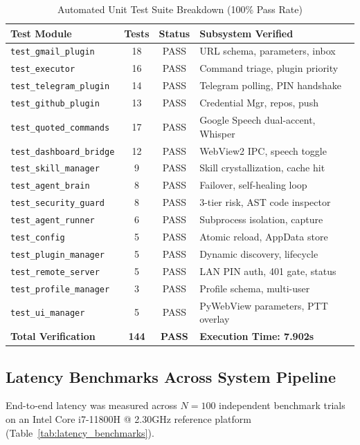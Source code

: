 \documentclass[conference]{IEEEtran}
\begin{document}
\begin{table}[htbp]
\centering
\caption{Automated Unit Test Suite Breakdown (100\% Pass Rate)}
\label{tab:test_suite}
\small
\begin{tabularx}{\columnwidth}{|l|c|c|X|}
\hline
\textbf{Test Module} & \textbf{Tests} & \textbf{Status} & \textbf{Subsystem Verified} \\ \hline
\texttt{test\_gmail\_plugin} & 18 & PASS & URL schema, parameters, inbox \\ \hline
\texttt{test\_executor} & 16 & PASS & Command triage, plugin priority \\ \hline
\texttt{test\_telegram\_plugin} & 14 & PASS & Telegram polling, PIN handshake \\ \hline
\texttt{test\_github\_plugin} & 13 & PASS & Credential Mgr, repos, push \\ \hline
\texttt{test\_quoted\_commands}& 17 & PASS & Google Speech dual-accent, Whisper \\ \hline
\texttt{test\_dashboard\_bridge}& 12 & PASS & WebView2 IPC, speech toggle \\ \hline
\texttt{test\_skill\_manager} & 9 & PASS & Skill crystallization, cache hit \\ \hline
\texttt{test\_agent\_brain} & 8 & PASS & Failover, self-healing loop \\ \hline
\texttt{test\_security\_guard} & 8 & PASS & 3-tier risk, AST code inspector \\ \hline
\texttt{test\_agent\_runner} & 6 & PASS & Subprocess isolation, capture \\ \hline
\texttt{test\_config} & 5 & PASS & Atomic reload, AppData store \\ \hline
\texttt{test\_plugin\_manager} & 5 & PASS & Dynamic discovery, lifecycle \\ \hline
\texttt{test\_remote\_server} & 5 & PASS & LAN PIN auth, 401 gate, status \\ \hline
\texttt{test\_profile\_manager}& 3 & PASS & Profile schema, multi-user \\ \hline
\texttt{test\_ui\_manager} & 5 & PASS & PyWebView parameters, PTT overlay \\ \hline
\textbf{Total Verification} & \textbf{144} & \textbf{PASS} & \textbf{Execution Time: 7.902s} \\ \hline
\end{tabularx}
\end{table}

\subsection{Latency Benchmarks Across System Pipeline}
End-to-end latency was measured across $N=100$ independent benchmark trials on an Intel Core i7-11800H @ 2.30GHz reference platform (Table~\ref{tab:latency_benchmarks}).
\end{document}
